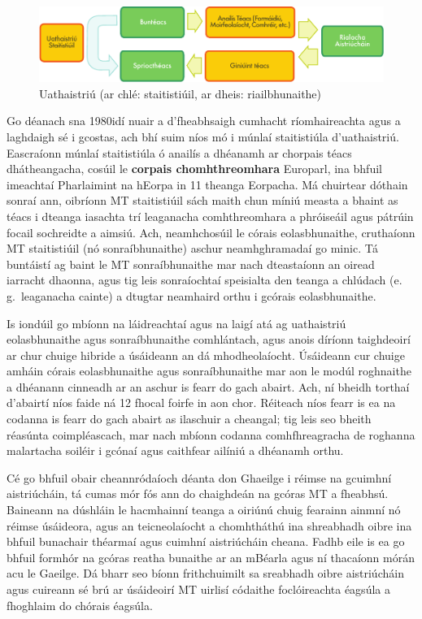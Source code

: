\begin{multicols}{2}
\begin{figure}[htb]
  \center
  \includegraphics[width=\textwidth]{../_media/irish/machine_translation}
  \caption{Uathaistriú (ar chlé: staitistiúil, ar dheis: riailbhunaithe)}
  \label{fig:mtarch_de}
\end{figure}

Go déanach sna 1980idí nuair a d’fheabhsaigh cumhacht ríomhaireachta agus a laghdaigh sé i gcostas, ach bhí suim níos mó i múnlaí staitistiúla d’uathaistriú. Eascraíonn múnlaí staitistiúla ó anailís a dhéanamh ar chorpais téacs dhátheangacha, cosúil le \textbf{corpais chomhthreomhara} Europarl, ina bhfuil imeachtaí Pharlaimint na hEorpa in 11 theanga Eorpacha. Má chuirtear dóthain sonraí ann, oibríonn MT staitistiúil sách maith chun míniú measta a bhaint as téacs i dteanga iasachta trí leaganacha comhthreomhara a phróiseáil agus pátrúin focail sochreidte a aimsiú. Ach, neamhchosúil le córais eolasbhunaithe, cruthaíonn MT staitistiúil (nó sonraíbhunaithe) aschur neamhghramadaí go minic. Tá buntáistí ag baint le MT sonraíbhunaithe mar nach dteastaíonn an oiread iarracht dhaonna, agus tig leis sonraíochtaí speisialta den teanga a chlúdach (e.\,g.~leaganacha cainte) a dtugtar neamhaird orthu i gcórais eolasbhunaithe. 

Is iondúil go mbíonn na láidreachtaí agus na laigí atá ag uathaistriú eolasbhunaithe agus sonraíbhunaithe comhlántach, agus anois díríonn taighdeoirí ar chur chuige hibride a úsáideann an dá mhodheolaíocht. Úsáideann cur chuige amháin córais eolasbhunaithe agus sonraíbhunaithe mar aon le modúl roghnaithe a dhéanann cinneadh ar an aschur is fearr do gach abairt. Ach, ní bheidh torthaí d'abairtí níos faide ná 12 fhocal foirfe in aon chor. Réiteach níos fearr is ea na codanna is fearr do gach abairt as ilaschuir a cheangal; tig leis seo bheith réasúnta coimpléascach, mar nach mbíonn codanna comhfhreagracha de roghanna malartacha soiléir i gcónaí agus caithfear ailíniú a dhéanamh orthu. 


Cé go bhfuil obair cheannródaíoch déanta don Ghaeilge i réimse na gcuimhní aistriúcháin, tá cumas mór fós ann do chaighdeán na gcóras MT a fheabhsú. Baineann na dúshláin le hacmhainní teanga a oiriúnú chuig fearainn ainmní nó réimse úsáideora, agus an teicneolaíocht a chomhtháthú ina shreabhadh oibre ina bhfuil bunachair théarmaí agus cuimhní aistriúcháin cheana. Fadhb eile is ea go bhfuil formhór na gcóras reatha bunaithe ar an mBéarla agus ní thacaíonn mórán acu le Gaeilge. Dá bharr seo bíonn frithchuimilt sa sreabhadh oibre aistriúcháin agus cuireann sé brú ar úsáideoirí MT uirlisí códaithe foclóireachta éagsúla a fhoghlaim do chórais éagsúla. 


\end{multicols}
